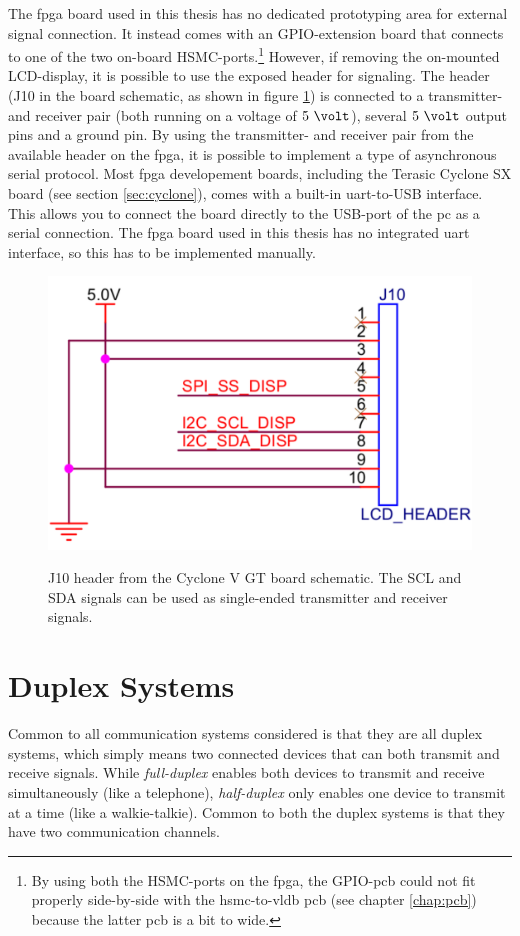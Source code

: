 \documentclass[main.tex]{subfiles}
\begin{document}
The \gls{fpga} board used in this thesis has no dedicated prototyping area for external signal connection. It instead comes with an GPIO-extension board that connects to one of the two on-board HSMC-ports.\footnote{By using both the HSMC-ports on the \gls{fpga}, the GPIO-\gls{pcb} could not fit properly side-by-side with the \acrshort{hsmc}-to-\acrshort{vldb} \acrshort{pcb} (see chapter \ref{chap:pcb}) because the latter \gls{pcb} is a bit to wide.} However, if removing the on-mounted LCD-display, it is possible to use the exposed header for signaling. The header (J10 in the board schematic, as shown in figure \ref{fig:lcdheader}) is connected to a transmitter- and receiver pair (both running on a voltage of $5~\volt$), several $5~\volt$ output pins and a ground pin. By using the transmitter- and receiver pair from the available header on the \gls{fpga}, it is possible to implement a type of asynchronous serial protocol. Most \gls{fpga} developement boards, including the Terasic Cyclone SX board (see section \ref{sec:cyclone}), comes with a built-in \gls{uart}-to-USB interface. This allows you to connect the board directly to the USB-port of the \acrshort{pc} as a serial connection. The \gls{fpga} board used in this thesis has no integrated \gls{uart} interface, so this has to be implemented manually.

\begin{figure}[] %
\includegraphics[width=0.5\linewidth]{../img/lcdheader.pdf}  \\[0.1 cm]
\caption{J10 header from the Cyclone V GT board schematic. The SCL and SDA signals can be used as single-ended transmitter and receiver signals.}
\label{fig:lcdheader}
\end{figure}

\section{Duplex Systems}

Common to all communication systems considered is that they are all duplex systems, which simply means two connected devices that can both transmit and receive signals. While \textit{full-duplex} enables both devices to transmit and receive simultaneously (like a telephone), \textit{half-duplex} only enables one device to transmit at a time (like a walkie-talkie). Common to both the duplex systems is that they have two communication channels. 
\end{document}
